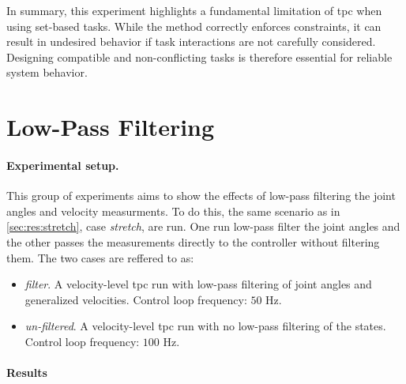 In summary, this experiment highlights a fundamental limitation of \gls{tpc} when using set-based tasks. While the method correctly enforces constraints, it can result in undesired behavior if task interactions are not carefully considered. Designing compatible and non-conflicting tasks is therefore essential for reliable system behavior.

\FloatBarrier


\newpage
\section{Low-Pass Filtering}
\label{sec:results:lowpass_filtering}
\label{sec:results:lowpass}

\paragraph{Experimental setup.}
This group of experiments aims to show the effects of low-pass filtering the
joint angles and velocity measurments. To do this, the same scenario as in \autoref{sec:res:stretch}, case \textit{stretch},
are run. One run low-pass filter the joint angles and the other passes the measurements
directly to the controller without filtering them. The two cases are reffered to as:
\begin{itemize}
    \item \textit{filter}. A velocity-level \gls{tpc} run with low-pass filtering of joint angles and generalized velocities.
        Control loop frequency: \(50\) Hz.
    \item \textit{un-filtered}. A velocity-level \gls{tpc} run with no low-pass filtering of the states.
        Control loop frequency: \(100\) Hz.
\end{itemize}

\paragraph{Results}

